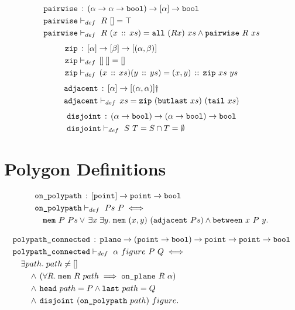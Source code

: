 \begin{align*}
  & \texttt{pairwise}\,:\,(\alpha \rightarrow \alpha \rightarrow \texttt{bool}) \rightarrow [\alpha] \rightarrow \texttt{bool}\\
  & \texttt{pairwise}\vdash_{def}\ R\ [] = \top\\
  & \texttt{pairwise}\vdash_{def}\ R\ (x\,::\,xs) = \texttt{all}\ (R x)\ xs \wedge \texttt{pairwise}\ R\ xs
\end{align*}
\begin{align*}
  & \texttt{zip}\,:\,[\alpha]\rightarrow[\beta]\rightarrow[(\alpha,\beta)]\\
  & \texttt{zip}\vdash_{def}\,[]\,[] = []\\
  & \texttt{zip}\vdash_{def}\,(x\,::\,xs)(y\,::\,ys) = (x,y)\,::\,\texttt{zip}\ xs\ ys
\end{align*}
\begin{align*}
  & \code{adjacent}\,:\,[\alpha]\rightarrow[(\alpha,\alpha)]\dag\\
  & \code{adjacent}\vdash_{def}\,xs = \code{zip}\ (\code{butlast}\ xs)\ (\code{tail}\ xs)
\end{align*}
\begin{align*}
  & \texttt{disjoint}\,:\,(\alpha\rightarrow\texttt{bool})\rightarrow(\alpha\rightarrow\texttt{bool})\rightarrow\texttt{bool}\\
  & \texttt{disjoint}\vdash_{def}\ S\ T = S \cap T = \emptyset
\end{align*}

\section{Polygon Definitions}
\begin{align*}
  &\code{on\_polypath}\,:\,[\code{point}] \rightarrow \code{point} \rightarrow \code{bool}\\
  &\code{on\_polypath}\vdash_{def}\ Ps\ P \iff\\
  &\quad\code{mem}\ P\ Ps\vee\,\exists x\;\exists y.\; \code{mem}\ (x,y)\ (\code{adjacent}\ Ps) \wedge \between{x}{P}{y}.
\end{align*}

\begin{align*}
  &\code{polypath\_connected}\,:\,\code{plane}\rightarrow(\code{point} \rightarrow \code{bool}) \rightarrow \code{point} \rightarrow \code{point} \rightarrow \code{bool}\\
  &\code{polypath\_connected}\vdash_{def}\ \alpha\ figure\ P\ Q \iff\\
  &\quad\exists path.\; path \neq []\\
  &\qquad\wedge\,(\forall R.\;\code{mem}\ R\ path \implies \onplane{R}{\alpha})\\
  &\qquad\wedge\,\code{head}\ path = P \wedge \code{last}\ path = Q\\
  &\qquad\wedge\,\code{disjoint}\ (\code{on\_polypath}\ path)\ figure.
\end{align*}

